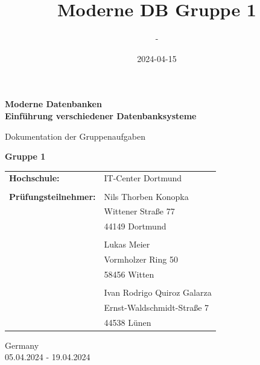 \documentclass[11pt,a4paper]{article}
\title{Moderne DB Gruppe 1}
\date{2024-04-15}
\author{-}
\begin{document}
	\begin{titlepage}
		\begin{center}
			\vspace*{1cm}
			
			\Huge
			\textbf{Moderne Datenbanken\\ Einführung verschiedener Datenbanksysteme}
			
			\vspace{0.5cm}
			\LARGE
			Dokumentation der Gruppenaufgaben
			
			\vspace{1.5cm}
			
			\textbf{Gruppe 1}
			
			\vspace{1.75cm}
			
			\vfill
			
			\vspace{1.0cm}
			
			\large
			\begin{tabular}{p{8cm}l}
				\textbf{Hochschule:} & IT-Center Dortmund\\ 
				&\\
				\textbf{Prüfungsteilnehmer:} & Nils Thorben Konopka\\
				& Wittener Straße 77\\
				& 44149 Dortmund\\
				&\\
				& Lukas Meier\\
				& Vormholzer Ring 50\\
				& 58456 Witten\\
				&\\
				& Ivan Rodrigo Quiroz Galarza\\
				& Ernst-Waldschmidt-Straße 7\\
				& 44538 Lünen
			\end{tabular}
			
			\vspace{2.0cm}
			
			\Large
			\vspace{0.20cm}
			Germany\\
			05.04.2024 - 19.04.2024
			
		\end{center}
	\end{titlepage}
	
\end{document}
